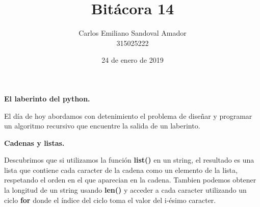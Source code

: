 \documentclass[letterpaper, 12pt, oneside]{article}%
\title{Bitácora 14}
\author{Carlos Emiliano Sandoval Amador \\ 315025222}
\date{24 de enero de 2019}
\begin{document}
	\maketitle
	\begin{center}
		\textbf{\large El laberinto del python.} 
	\end{center}
	El día de hoy abordamos con detenimiento el problema de diseñar y programar un algoritmo recursivo que encuentre la salida de un laberinto. \\
	\begin{center}
		\textbf{\large Cadenas y listas.} 
	\end{center}
	Descubrimos que si utilizamos la función \textbf{list()} en un string, el resultado es una lista que contiene cada caracter de la cadena como un elemento de la lista, respetando el orden en el que aparecian en la cadena. Tambien podemos obtener la longitud de un string usando \textbf{len()} y acceder a cada caracter utilizando un ciclo \textbf{for} donde el índice del ciclo toma el valor del i-ésimo caracter.
\end{document}
